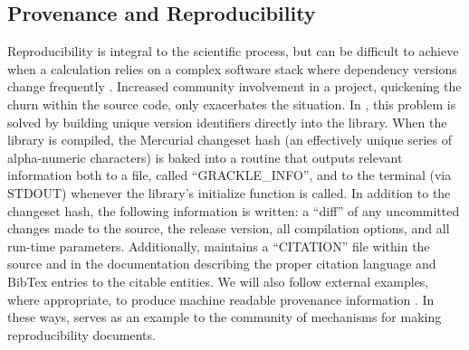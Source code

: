 


\subsection{Provenance and Reproducibility}

Reproducibility is integral to the scientific process, but can be
difficult to achieve when a calculation relies on a complex software
stack where dependency versions change frequently
\citep{2014arXiv1412.5557J, 2016arXiv161009958L}.  Increased
community involvement in a project, quickening the churn within the
source code, only exacerbates the situation.  In \grackle{}, this
problem is solved by building unique version identifiers directly
into the library.  When the library is compiled, the Mercurial
changeset hash (an effectively unique series of alpha-numeric
characters) is baked into a routine that outputs relevant information
both to a file, called ``GRACKLE\_INFO'', and to the terminal (via
STDOUT) whenever the library's initialize function is called.  In
addition to the changeset hash, the following information is written:
a ``diff'' of any uncommitted changes made to the source, the release
version, all compilation options, and all run-time parameters.
Additionally, \grackle{} maintains a ``CITATION'' file within the
source and in the documentation describing the proper citation
language and BibTex entries to the citable entities.  We will also
follow external examples, where appropriate, to produce machine
readable provenance information \citep[e.g.,][]{force11,
  Fenner097196}.  In these ways, \grackle{} serves as an example to
the community of mechanisms for making reproducibility documents.

